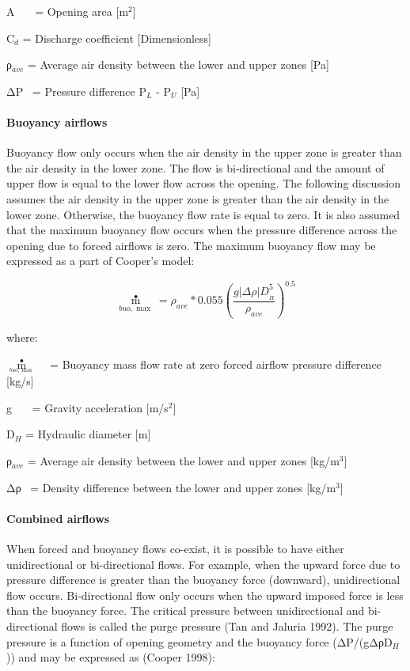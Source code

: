 A~~~ = Opening area {[}m\(^{2}\){]}

C\(_{d}\) = Discharge coefficient {[}Dimensionless{]}

ρ\(_{ave}\) = Average air density between the lower and upper zones {[}Pa{]}

ΔP~ = Pressure difference P\(_{L}\) - P\(_{U}\) {[}Pa{]}

\paragraph{Buoyancy airflows}\label{buoyancy-airflows}

Buoyancy flow only occurs when the air density in the upper zone is greater than the air density in the lower zone. The flow is bi-directional and the amount of upper flow is equal to the lower flow across the opening. The following discussion assumes the air density in the upper zone is greater than the air density in the lower zone. Otherwise, the buoyancy flow rate is equal to zero. It is also assumed that the maximum buoyancy flow occurs when the pressure difference across the opening due to forced airflows is zero. The maximum buoyancy flow may be expressed as a part of Cooper's model:

\begin{equation}
{\mathop m\limits^ \bullet_{buo,\max }} = {\rho_{ave}}*0.055{\left( {\frac{{g\left| {\Delta \rho } \right|D_{_H}^5}}{{{\rho_{ave}}}}} \right)^{0.5}}
\end{equation}

where:

\({\mathop m\limits^ \bullet_{_{buo,\max }}}\) ~ = Buoyancy mass flow rate at zero forced airflow pressure difference {[}kg/s{]}

g~~~ = Gravity acceleration {[}m/s\(^{2}\){]}

D\(_{H}\) = Hydraulic diameter {[}m{]}

ρ\(_{ave}\) = Average air density between the lower and upper zones {[}kg/m\(^{3}\){]}

Δρ~ = Density difference between the lower and upper zones {[}kg/m\(^{3}\){]}

\paragraph{Combined airflows}\label{combined-airflows}

When forced and buoyancy flows co-exist, it is possible to have either unidirectional or bi-directional flows. For example, when the upward force due to pressure difference is greater than the buoyancy force (downward), unidirectional flow occurs. Bi-directional flow only occurs when the upward imposed force is less than the buoyancy force. The critical pressure between unidirectional and bi-directional flows is called the purge pressure (Tan and Jaluria 1992). The purge pressure is a function of opening geometry and the buoyancy force (ΔP/(gΔρD\(_{H}\))) and may be expressed as (Cooper 1998):

